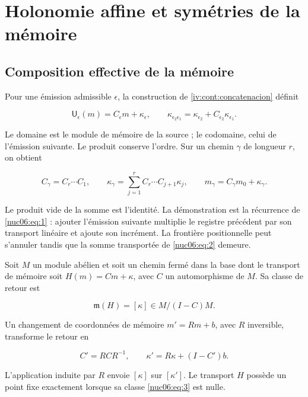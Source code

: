 \section{Holonomie affine et symétries de la mémoire
}
\label{nuclear:6}
\subsection{Composition effective de la mémoire
}

Pour une émission admissible \(\epsilon\), la construction de \cref{iv:cont:concatenacion} définit


\begin{equation}
\mathsf U_\epsilon(m)=C_\epsilon m+\kappa_\epsilon,
\qquad
\kappa_{\epsilon_2\epsilon_1}
=\kappa_{\epsilon_2}+C_{\epsilon_2}\kappa_{\epsilon_1}.
\label{nuc06:eq:1}
\end{equation}

Le domaine est le module de mémoire de la source ; le codomaine, celui de l’émission suivante. Le produit conserve l’ordre. Sur un chemin \(\gamma\) de longueur \(r\), on obtient

\begin{equation}
C_\gamma=C_r\cdots C_1,\qquad
\kappa_\gamma=\sum_{j=1}^r C_r\cdots C_{j+1}\kappa_j,
\qquad
m_\gamma=C_\gamma m_0+\kappa_\gamma.
\label{nuc06:eq:2}
\end{equation}

Le produit vide de la somme est l’identité. La démonstration est la récurrence de \eqref{nuc06:eq:1} : ajouter l’émission suivante multiplie le registre précédent par son transport linéaire et ajoute son incrément. La frontière positionnelle peut s’annuler tandis que la somme transportée de \eqref{nuc06:eq:2} demeure.


\begin{proposition}

Soit \(M\) un module abélien et soit un chemin fermé dans la base dont le transport de mémoire soit \(H(m)=Cm+\kappa\), avec \(C\) un automorphisme de \(M\). Sa classe de retour est

\begin{equation}
\mathfrak m(H)=[\kappa]\in M/(I-C)M.
\label{nuc06:eq:3}
\end{equation}

Un changement de coordonnées de mémoire \(m'=Rm+b\), avec \(R\) inversible, transforme le retour en

\begin{equation}
C'=RCR^{-1},\qquad
\kappa'=R\kappa+(I-C')b.
\label{nuc06:eq:4}
\end{equation}

L’application induite par \(R\) envoie \([\kappa]\) sur \([\kappa']\). Le transport \(H\) possède un point fixe exactement lorsque sa classe \eqref{nuc06:eq:3} est nulle.
\end{proposition}

